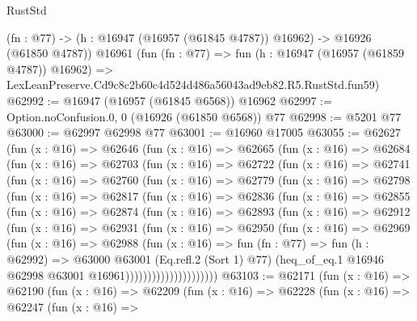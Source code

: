 \begin{lexlean}{RustStd}
\begin{coremodule}
    (fn : @77) -> (h : @16947 (@16957 (@61845 @4787)) @16962) -> @16926 (@61850 @4787))
    @16961
    (fun (fn : @77) =>
    fun (h : @16947 (@16957 (@61859 @4787)) @16962) =>
    LexLeanPreserve.Cd9c8c2b60c4d524d486a56043ad9eb82.R5.RustStd.fun59)
@62992 := @16947 (@16957 (@61845 @6568)) @16962
@62997 := Option.noConfusion.{0, 0} (@16926 (@61850 @6568)) @77
@62998 := @5201 @77
@63000 := @62997 @62998 @77
@63001 := @16960 @17005
@63055 := @62627
    (fun (x : @16) =>
    @62646
      (fun (x : @16) =>
      @62665
        (fun (x : @16) =>
        @62684
          (fun (x : @16) =>
          @62703
            (fun (x : @16) =>
            @62722
              (fun (x : @16) =>
              @62741
                (fun (x : @16) =>
                @62760
                  (fun (x : @16) =>
                  @62779
                    (fun (x : @16) =>
                    @62798
                      (fun (x : @16) =>
                      @62817
                        (fun (x : @16) =>
                        @62836
                          (fun (x : @16) =>
                          @62855
                            (fun (x : @16) =>
                            @62874
                              (fun (x : @16) =>
                              @62893
                                (fun (x : @16) =>
                                @62912
                                  (fun (x : @16) =>
                                  @62931
                                    (fun (x : @16) =>
                                    @62950
                                      (fun (x : @16) =>
                                      @62969
                                        (fun (x : @16) =>
                                        @62988
                                          (fun (x : @16) =>
                                          fun (fn : @77) =>
                                          fun (h : @62992) =>
                                          @63000
                                            @63001
                                            (Eq.refl.{2} (Sort 1) @77)
                                            (heq_of_eq.{1}
                                              @16946
                                              @62998
                                              @63001
                                              @16961)))))))))))))))))))))
@63103 := @62171
    (fun (x : @16) =>
    @62190
      (fun (x : @16) =>
      @62209
        (fun (x : @16) =>
        @62228
          (fun (x : @16) =>
          @62247
            (fun (x : @16) =>

\end{coremodule}
\end{lexlean}
